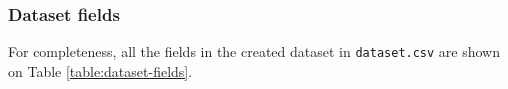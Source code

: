 



\subsubsection{Dataset fields}

For completeness, all the fields in the created dataset in \texttt{dataset.csv} are shown on Table \ref{table:dataset-fields}.

